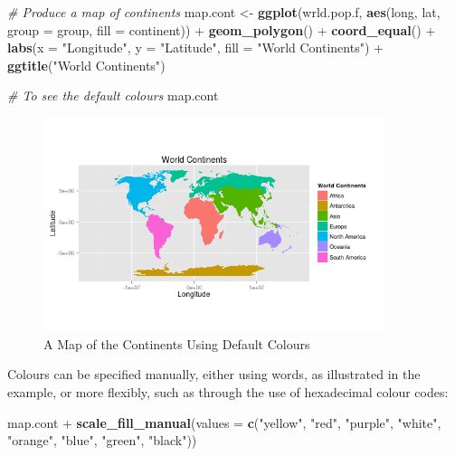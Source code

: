 \documentclass[]{article}
\newenvironment{Shaded}{}{}
\newcommand{\KeywordTok}[1]{\textcolor[rgb]{0.00,0.44,0.13}{\textbf{{#1}}}}
\newcommand{\DataTypeTok}[1]{\textcolor[rgb]{0.56,0.13,0.00}{{#1}}}
\newcommand{\StringTok}[1]{\textcolor[rgb]{0.25,0.44,0.63}{{#1}}}
\newcommand{\CommentTok}[1]{\textcolor[rgb]{0.38,0.63,0.69}{\textit{{#1}}}}
\newcommand{\NormalTok}[1]{{#1}}
\let\Oldincludegraphics\includegraphics
\renewcommand{\includegraphics}[1]{\Oldincludegraphics[width=10cm]{#1}}
\begin{document}
\begin{Shaded}
\begin{Highlighting}[]
\CommentTok{# Produce a map of continents}
\NormalTok{map.cont <- }\KeywordTok{ggplot}\NormalTok{(wrld.pop.f, }\KeywordTok{aes}\NormalTok{(long, lat, }\DataTypeTok{group =} \NormalTok{group, }\DataTypeTok{fill =} \NormalTok{continent)) + }
    \KeywordTok{geom_polygon}\NormalTok{() + }\KeywordTok{coord_equal}\NormalTok{() + }\KeywordTok{labs}\NormalTok{(}\DataTypeTok{x =} \StringTok{"Longitude"}\NormalTok{, }\DataTypeTok{y =} \StringTok{"Latitude"}\NormalTok{, }\DataTypeTok{fill =} \StringTok{"World Continents"}\NormalTok{) + }
    \KeywordTok{ggtitle}\NormalTok{(}\StringTok{"World Continents"}\NormalTok{)}

\CommentTok{# To see the default colours}
\NormalTok{map.cont}
\end{Highlighting}
\end{Shaded}
\begin{figure}[htbp]
\centering
\includegraphics{figure/A_Map_of_the_Continents_Using_Default_Colours.png}
\caption{A Map of the Continents Using Default Colours}
\end{figure}

Colours can be specified manually, either using words, as illustrated in the example, or more flexibly, such as through the use of hexadecimal colour codes:

\begin{Shaded}
\begin{Highlighting}[]
\NormalTok{map.cont + }\KeywordTok{scale_fill_manual}\NormalTok{(}\DataTypeTok{values =} \KeywordTok{c}\NormalTok{(}\StringTok{"yellow"}\NormalTok{, }\StringTok{"red"}\NormalTok{, }\StringTok{"purple"}\NormalTok{, }\StringTok{"white"}\NormalTok{, }
    \StringTok{"orange"}\NormalTok{, }\StringTok{"blue"}\NormalTok{, }\StringTok{"green"}\NormalTok{, }\StringTok{"black"}\NormalTok{))}
\end{Highlighting}
\end{Shaded}
\end{document}
